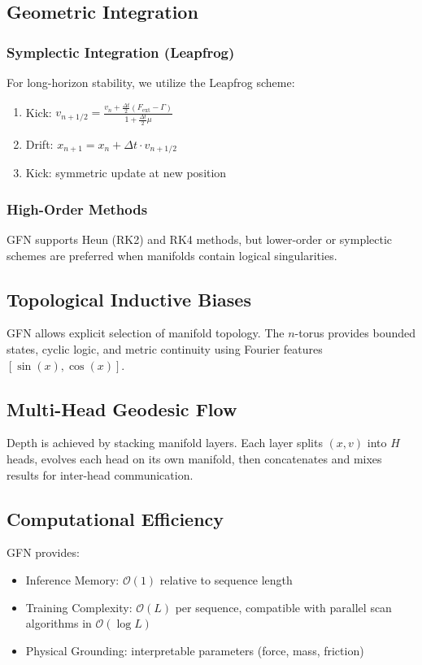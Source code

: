 \documentclass{article}
\numberwithin{equation}{section}
\begin{document}
\subsection{Geometric Integration}
\subsubsection{Symplectic Integration (Leapfrog)}
For long-horizon stability, we utilize the Leapfrog scheme:
\begin{enumerate}
\item Kick: $v_{n+1/2} = \frac{v_n + \frac{\Delta t}{2}(F_{\text{ext}} - \Gamma)}{1 + \frac{\Delta t}{2}\mu}$
\item Drift: $x_{n+1} = x_n + \Delta t \cdot v_{n+1/2}$
\item Kick: symmetric update at new position
\end{enumerate}

\subsubsection{High-Order Methods}
GFN supports Heun (RK2) and RK4 methods, but lower-order or symplectic schemes are preferred when manifolds contain logical singularities.

\subsection{Topological Inductive Biases}
GFN allows explicit selection of manifold topology. The $n$-torus provides bounded states, cyclic logic, and metric continuity using Fourier features $[\sin(x), \cos(x)]$.

\subsection{Multi-Head Geodesic Flow}
Depth is achieved by stacking manifold layers. Each layer splits $(x, v)$ into $H$ heads, evolves each head on its own manifold, then concatenates and mixes results for inter-head communication.

\subsection{Computational Efficiency}
GFN provides:
\begin{itemize}
\item Inference Memory: $\mathcal{O}(1)$ relative to sequence length
\item Training Complexity: $\mathcal{O}(L)$ per sequence, compatible with parallel scan algorithms in $\mathcal{O}(\log L)$
\item Physical Grounding: interpretable parameters (force, mass, friction)
\end{itemize}
\end{document}
